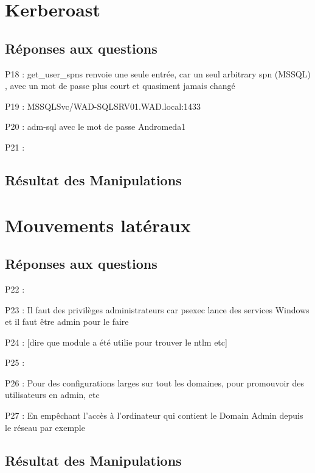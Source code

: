\documentclass[12pt]{report} %
\begin{document}
\newpage

\section*{Kerberoast}

\subsection*{Réponses aux questions}
\par P18 : get\_user\_spns renvoie une seule entrée, car un seul arbitrary spn (MSSQL) , avec un mot de passe plus court et quasiment jamais changé
\par P19 : MSSQLSvc/WAD-SQLSRV01.WAD.local:1433
\par P20 : adm-sql avec le mot de passe Andromeda1
\par P21	: 

\subsection*{Résultat des Manipulations}

\newpage

\section*{Mouvements latéraux}

\subsection*{Réponses aux questions}
\par P22	:
\par P23	: Il  faut des privilèges administrateurs car psexec lance des services Windows et il faut être admin pour le faire
\par P24	: [dire que module a été utilie pour trouver le ntlm etc]
\par P25	: 
\par P26	: Pour des configurations larges sur tout les domaines, pour promouvoir des utilisateurs en admin, etc
\par P27	: En empêchant l'accès à l'ordinateur qui contient le Domain Admin depuis le réseau par exemple

\subsection*{Résultat des Manipulations}
\end{document}
